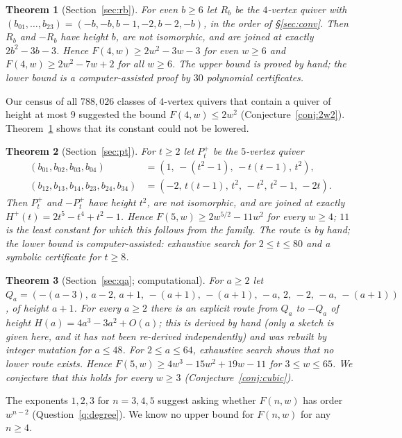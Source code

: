 \documentclass[11pt]{amsart}
\newtheorem{mainthm}{Theorem}
\theoremstyle{definition}
\theoremstyle{remark}
\begin{document}
\begin{mainthm}[Section~\ref{sec:rb}]\label{thmB}
For even $b\ge6$ let $R_b$ be the $4$-vertex quiver with $(b_{01},\dots,b_{23})=(-b,-b,b-1,-2,b-2,-b)$, in the order of \S\ref{sec:conv}. Then $R_b$ and $-R_b$ have height $b$, are not isomorphic, and are joined at exactly $2b^2-3b-3$. Hence $F(4,w)\ge 2w^2-3w-3$ for even $w\ge6$ and $F(4,w)\ge 2w^2-7w+2$ for all $w\ge6$. The upper bound is proved by hand; the lower bound is a computer-assisted proof by $30$ polynomial certificates.
\end{mainthm}

Our census of all $788{,}026$ classes of $4$-vertex quivers that contain a quiver of height at most $9$ suggested the bound $F(4,w)\le 2w^2$ (Conjecture~\ref{conj:2w2}). Theorem~\ref{thmB} shows that its constant could not be lowered.

\begin{mainthm}[Section~\ref{sec:pt}]\label{thmC}
For $t\ge2$ let $P^+_t$ be the $5$-vertex quiver
\begin{align*}
(b_{01},b_{02},b_{03},b_{04})&=(1,\,-(t^2-1),\,-t(t-1),\,t^2),\\
(b_{12},b_{13},b_{14},b_{23},b_{24},b_{34})&=(-2,\,t(t-1),\,t^2,\,-t^2,\,t^2-1,\,-2t).
\end{align*}
Then $P^+_t$ and $-P^+_t$ have height $t^2$, are not isomorphic, and are joined at exactly $H^+(t)=2t^5-t^4+t^2-1$. Hence $F(5,w)\ge 2w^{5/2}-11w^2$ for every $w\ge4$; $11$ is the least constant for which this follows from the family. The route is by hand; the lower bound is computer-assisted: exhaustive search for $2\le t\le80$ and a symbolic certificate for $t\ge8$.
\end{mainthm}

\begin{mainthm}[Section~\ref{sec:qa}; computational]\label{thmD}
For $a\ge2$ let $Q_a=(-(a-3),\,a-2,\,a+1,\,-(a+1),\,-(a+1),\,-a,\,2,\,-2,\,-a,\,-(a+1))$, of height $a+1$. For every $a\ge2$ there is an explicit route from $Q_a$ to $-Q_a$ of height $H(a)=4a^3-3a^2+O(a)$; this is derived by hand (only a sketch is given here, and it has not been re-derived independently) and was rebuilt by integer mutation for $a\le48$. For $2\le a\le64$, exhaustive search shows that no lower route exists. Hence $F(5,w)\ge 4w^3-15w^2+19w-11$ for $3\le w\le65$. We conjecture that this holds for every $w\ge3$ (Conjecture~\ref{conj:cubic}).
\end{mainthm}

The exponents $1,2,3$ for $n=3,4,5$ suggest asking whether $F(n,w)$ has order $w^{n-2}$ (Question~\ref{q:degree}). We know no upper bound for $F(n,w)$ for any $n\ge4$.
\end{document}
